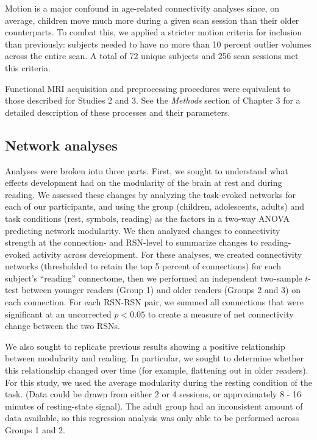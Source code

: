 Motion is a major confound in age-related connectivity analyses since, on average, children move much more during a given scan session than their older counterparts. To combat this, we applied a stricter motion criteria for inclusion than previously: subjects needed to have no more than 10 percent outlier volumes across the entire scan. A total of 72 unique subjects and 256 scan sessions met this criteria. 

Functional MRI acquisition and preprocessing procedures were equivalent to those described for Studies 2 and 3. See the \textit{Methods} section of Chapter 3 for a detailed description of these processes and their parameters.

\subsection{Network analyses}

Analyses were broken into three parts. First, we sought to understand what effects development had on the modularity of the brain at rest and during reading. We assessed these changes by analyzing the task-evoked networks for each of our participants, and using the group (children, adolescents, adults) and task conditions (rest, symbols, reading) as the factors in a two-way ANOVA predicting network modularity. We then analyzed changes to connectivity strength at the connection- and RSN-level to summarize changes to reading-evoked activity across development. For these analyses, we created connectivity networks (thresholded to retain the top 5 percent of connections) for each subject's ``reading'' connectome, then we performed an independent two-sample $t$-test between younger readers (Group 1) and older readers (Groups 2 and 3) on each connection. For each RSN-RSN pair, we summed all connections that were significant at an uncorrected $p < 0.05$ to create a measure of net connectivity change between the two RSNs.

We also sought to replicate previous results showing a positive relationship between modularity and reading. In particular, we sought to determine whether this relationship changed over time (for example, flattening out in older readers). For this study, we used the average modularity during the resting condition of the task. (Data could be drawn from either 2 or 4 sessions, or approximately 8 - 16 minutes of resting-state signal). The adult group had an inconsistent amount of data available, so this regression analysis was only able to be performed across Groups 1 and 2.

